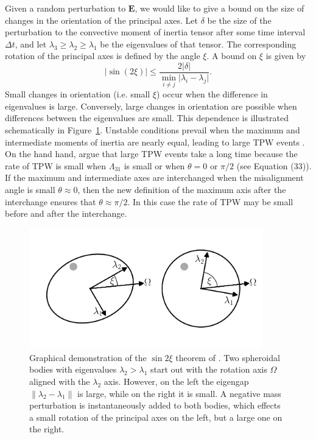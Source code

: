 \documentclass[preprint,12pt,authoryear]{elsarticle}
\begin{document}
Given a random perturbation to $\mathbf{E}$, we would like to give a bound on the size of changes in the orientation of the principal axes. Let $\delta$ be the size of the perturbation to the convective moment of inertia tensor after some time interval $\Delta t$, and let $\lambda_3 \ge \lambda_2 \ge \lambda_1$ be the eigenvalues of that tensor.  The corresponding rotation of the principal axes is defined by the angle $\xi$. A bound on $\xi$ is given by \citep{davis1970rotation}
\begin{equation}
\vert \sin(2 \xi) \vert \le \frac{ 2 \vert \delta \vert}{ \displaystyle \min_{i \neq j} \vert \lambda_i - \lambda_j \vert }.
\label{eq:kahan}
\end{equation} 
Small changes in orientation (i.e. small $\xi$) occur when the difference in eigenvalues is large. Conversely, large changes in orientation are possible when differences between the eigenvalues are small. 
This dependence is illustrated schematically in Figure~\ref{fig:perturb}.  Unstable conditions prevail when the maximum and intermediate moments of inertia are nearly equal, leading to large TPW events \citep{evans1998true}. On the hand hand, \citet{tsai2007theoretical} argue that large TPW events take a long time because the rate of TPW is small when $\Lambda_{31}$ is small or when $\theta = 0$ or $\pi/2$ (see Equation (33)). If the maximum and intermediate axes are interchanged when the misalignment angle is small $\theta \approx 0$, then the new definition of the maximum axis after the interchange ensures that $\theta \approx \pi/2$. In this case the rate of TPW may be small before and after the interchange. 

\begin{figure}
\centering
\includegraphics[width=0.9\textwidth]{figures/perturb.pdf}
\caption{Graphical demonstration of the $\sin{2 \xi}$ theorem of \citet{davis1970rotation}.  Two spheroidal bodies with eigenvalues $\lambda_2 > \lambda_1$ start out with the rotation axis $\Omega$ aligned with the $\lambda_2$ axis. However, on the left the eigengap $\lVert \lambda_2 - \lambda_1 \rVert$ is large, while on the right it is small.  A negative mass perturbation is instantaneously added to both bodies, which effects a small rotation of the principal axes on the left, but a large one on the right.}
\label{fig:perturb}
\end{figure}
\end{document}
